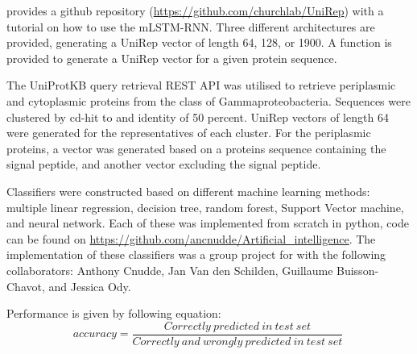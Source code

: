 \cite{alley2019} provides a github repository (\url{https://github.com/churchlab/UniRep}) with a tutorial on how to use the mLSTM-RNN.
Three different architectures are provided, 
generating a UniRep vector of length 64, 128, or 1900.
A function is provided to generate a UniRep vector for a given protein sequence.

The UniProtKB query retrieval REST API was utilised to retrieve periplasmic and cytoplasmic proteins from the class of Gammaproteobacteria.
Sequences were clustered by cd-hit to and identity of 50 percent.
UniRep vectors of length 64 were generated for the representatives of each cluster.
For the periplasmic proteins, a vector was generated based on a proteins sequence containing the signal peptide,
and another vector excluding the signal peptide.

Classifiers were constructed based on different machine learning methods:
multiple linear regression,
decision tree,
random forest,
Support Vector machine,
and neural network.
Each of these was implemented from scratch in python,
code can be found on \url{https://github.com/ancnudde/Artificial_intelligence}.
The implementation of these classifiers was a group project for with the following collaborators:
Anthony Cnudde,
Jan Van den Schilden,
Guillaume Buisson-Chavot, 
and Jessica Ody.

Performance is given by following equation:
~\begin{equation*}
	accuracy = \frac{Correctly\ predicted\ in\ test\ set}{Correctly\ and\ wrongly\ predicted\ in\ test\ set}
~\end{equation*}
